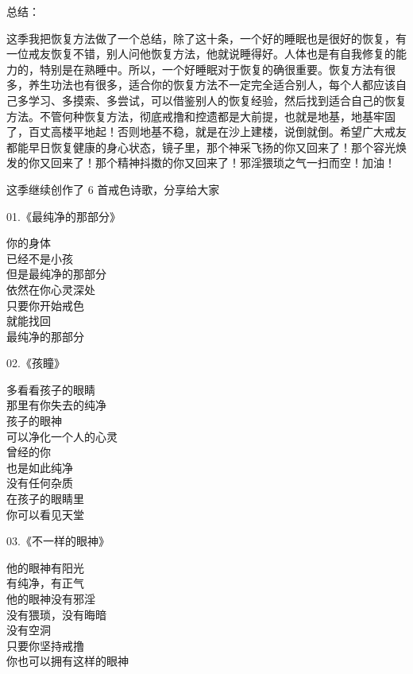 \documentclass{ctexart}
\begin{document}
总结：

这季我把恢复方法做了一个总结，除了这十条，一个好的睡眠也是很好的恢复，有一位戒友恢复不错，别人问他恢复方法，他就说睡得好。人体也是有自我修复的能力的，特别是在熟睡中。所以，一个好睡眠对于恢复的确很重要。恢复方法有很多，养生功法也有很多，适合你的恢复方法不一定完全适合别人，每个人都应该自己多学习、多摸索、多尝试，可以借鉴别人的恢复经验，然后找到适合自己的恢复方法。不管何种恢复方法，彻底戒撸和控遗都是大前提，也就是地基，地基牢固了，百丈高楼平地起！否则地基不稳，就是在沙上建楼，说倒就倒。希望广大戒友都能早日恢复健康的身心状态，镜子里，那个神采飞扬的你又回来了！那个容光焕发的你又回来了！那个精神抖擞的你又回来了！邪淫猥琐之气一扫而空！加油！

这季继续创作了 6 首戒色诗歌，分享给大家

\begin{multicols}{2}
    \begin{center}
        01.《最纯净的那部分》\it

        你的身体 \\ 已经不是小孩 \\ 但是最纯净的那部分 \\ 依然在你心灵深处 \\ 只要你开始戒色 \\ 就能找回 \\ 最纯净的那部分
    \end{center}

    \begin{center}
        02.《孩瞳》\it

        多看看孩子的眼睛 \\ 那里有你失去的纯净 \\ 孩子的眼神 \\ 可以净化一个人的心灵 \\ 曾经的你 \\ 也是如此纯净 \\ 没有任何杂质 \\ 在孩子的眼睛里 \\ 你可以看见天堂
    \end{center}

    \begin{center}
        03.《不一样的眼神》\it

        他的眼神有阳光 \\ 有纯净，有正气 \\ 他的眼神没有邪淫 \\ 没有猥琐，没有晦暗 \\ 没有空洞 \\ 只要你坚持戒撸 \\ 你也可以拥有这样的眼神
    \end{center}


\end{multicols}
\end{document}

